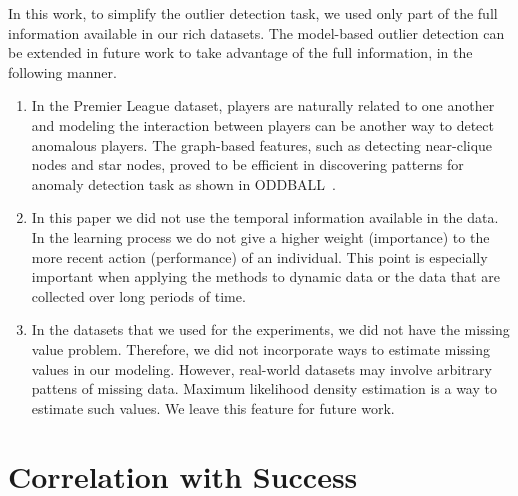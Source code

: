 {\begin{enumerate}
	In this work, to simplify the outlier detection task, we used only part of the full information available in our rich datasets. The model-based outlier detection can be extended in future work to take advantage of the full information, in the following manner. 
	\begin{enumerate}
		\item In the Premier League dataset, players are naturally related to one another and modeling the interaction between players can be another way to detect anomalous players.
		The graph-based features, such as detecting near-clique nodes and star nodes, proved to be efficient in discovering patterns for anomaly detection task as shown in ODDBALL~\cite{Akoglu2010}.
		\item In this paper we did not use the temporal information available in the data. In the learning process we do not give a higher weight (importance) to the more recent action (performance) of an individual. This point is especially important when applying the methods to dynamic data or the data that are collected over long periods of time. 
		\item In the datasets that we used for the experiments, we did not have the missing value problem. Therefore, we did not incorporate ways to estimate missing values in our modeling. However, real-world datasets may involve arbitrary pattens of missing data. Maximum likelihood density estimation is a way to estimate such values. We leave this feature for future work.
	\end{enumerate}
		\end{enumerate}

\section{Correlation with Success}
\label{sec:success}


}
